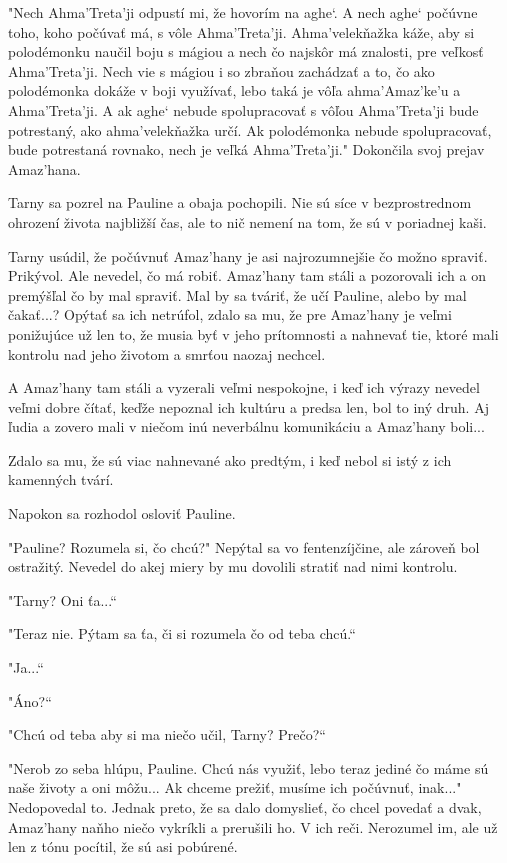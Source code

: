 \documentclass{book}
\begin{document}
"$ $Nech Ahma'Treta'ji odpustí mi, že hovorím na aghe‘. A nech aghe‘ počúvne toho, koho počúvať má, s vôle Ahma'Treta'ji. Ahma'velekňažka káže, aby si polodémonku naučil boju s mágiou a nech čo najskôr má znalosti, pre veľkosť Ahma'Treta'ji. Nech vie s mágiou i so zbraňou zachádzať a to, čo ako polodémonka dokáže v boji využívať, lebo taká je vôľa ahma'Amaz'ke'u a Ahma'Treta'ji. A ak aghe‘ nebude spolupracovať s vôľou Ahma'Treta'ji bude potrestaný, ako ahma'velekňažka určí. Ak polodémonka nebude spolupracovať, bude potrestaná rovnako, nech je veľká Ahma'Treta'ji."$ $ Dokončila svoj prejav Amaz'hana.

Tarny sa pozrel na Pauline a obaja pochopili. Nie sú síce v bezprostrednom ohrození života najbližší čas, ale to nič nemení na tom, že sú v poriadnej kaši.

Tarny usúdil, že počúvnuť Amaz'hany je asi najrozumnejšie čo možno spraviť. Prikývol. Ale nevedel, čo má robiť. Amaz'hany tam stáli a pozorovali ich a on premýšľal čo by mal spraviť. Mal by sa tváriť, že učí Pauline, alebo by mal čakať...? Opýtať sa ich netrúfol, zdalo sa mu, že pre Amaz'hany je veľmi ponižujúce už len to, že musia byť v jeho prítomnosti a nahnevať tie, ktoré mali kontrolu nad jeho životom a smrťou naozaj nechcel.

A Amaz'hany tam stáli a vyzerali veľmi nespokojne, i keď ich výrazy nevedel veľmi dobre čítať, keďže nepoznal ich kultúru a predsa len, bol to iný druh. Aj ľudia a zovero mali v niečom inú neverbálnu komunikáciu a Amaz'hany boli...

Zdalo sa mu, že sú viac nahnevané ako predtým, i keď nebol si istý z ich kamenných tvárí.

Napokon sa rozhodol osloviť Pauline.

"$ $Pauline? Rozumela si, čo chcú?"$ $ Nepýtal sa vo fentenzíjčine, ale zároveň bol ostražitý. Nevedel do akej miery by mu dovolili stratiť nad nimi kontrolu.

"$ $Tarny? Oni ťa...“

"$ $Teraz nie. Pýtam sa ťa, či si rozumela čo od teba chcú.“

"$ $Ja...“

"$ $Áno?“

"$ $Chcú od teba aby si ma niečo učil, Tarny? Prečo?“

"$ $Nerob zo seba hlúpu, Pauline. Chcú nás využiť, lebo teraz jediné čo máme sú naše životy a oni môžu... Ak chceme prežiť, musíme ich počúvnuť, inak..."$ $ Nedopovedal to. Jednak preto, že sa dalo domyslieť, čo chcel povedať a dvak, Amaz'hany naňho niečo vykríkli a prerušili ho. V ich reči. Nerozumel im, ale už len z tónu pocítil, že sú asi pobúrené.
\end{document}
